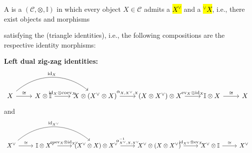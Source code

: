 \begin{definition} \label{definition:rigid_category}
A  is a  $(\mathcal{C}, \otimes, \mathbb{I})$ in which every object $X \in \mathcal{C}$ admits a  \hl{$X^{\vee}$} and a  \hl{${}^{\vee}\!X$}, i.e., there exist objects and morphisms



satisfying the  (triangle identities), i.e., the following compositions are the respective identity morphisms:

\bigskip

\noindent\textbf{Left dual zig-zag identities:}
$$\begin{tikzcd}
X \arrow[r, "\cong"] \arrow[rr, bend left=40, "\mathrm{id}_X"] & 
X \otimes \mathbb{I} \arrow[r, "\mathrm{id}_X \otimes \mathrm{coev}_X"] & 
X \otimes (X^{\vee} \otimes X) \arrow[r, "\alpha_{X, X^\vee, X}"] & 
(X \otimes X^{\vee}) \otimes X \arrow[r, "\mathrm{ev}_X \otimes \mathrm{id}_X"] & 
\mathbb{I} \otimes X \arrow[r, "\cong"] & X
\end{tikzcd}$$
and
$$\begin{tikzcd}
X^{\vee} \arrow[r, "\cong"] \arrow[rr, bend left=40, "\mathrm{id}_{X^\vee}"] & 
\mathbb{I} \otimes X^{\vee} \arrow[r, "\mathrm{coev}_X \otimes \mathrm{id}_{X^\vee}"] & 
(X^{\vee} \otimes X) \otimes X^{\vee} \arrow[r, "\alpha^{-1}_{X^\vee, X, X^\vee}"] & 
X^{\vee} \otimes (X \otimes X^{\vee}) \arrow[r, "\mathrm{id}_{X^\vee} \otimes \mathrm{ev}_X"] & 
X^{\vee} \otimes \mathbb{I} \arrow[r, "\cong"] & X^{\vee}
\end{tikzcd}$$

\bigskip


\end{definition}
